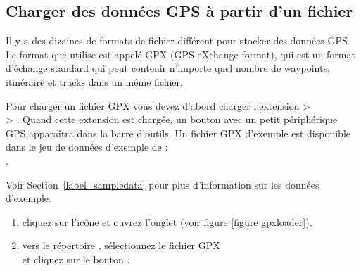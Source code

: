 \subsection{Charger des données GPS à partir d'un fichier}\label{label_loadgps}

Il y a des dizaines de formats de fichier différent pour stocker des données
GPS.
Le format que \qg utilise est appelé GPX (GPS eXchange format), qui est un format d'échange standard qui peut contenir n'importe quel nombre de waypoints, itinéraire et tracks dans un même fichier.

Pour charger un fichier GPX vous devez d'abord charger l'extension  >\\  > . Quand cette extension est chargée, un bouton avec un petit périphérique GPS apparaîtra dans la barre d'outils. Un fichier GPX d'exemple est disponible dans le jeu de données d'exemple de \qg :\\
. 
\par
Voir Section~\ref{label_sampledata} pour plus d'information sur les données d'exemple.

\begin{enumerate}
\item cliquez sur l'icône  et ouvrez l'onglet  (voir figure \ref{figure gpxloader}).
\item {} vers le répertoire , sélectionnez le fichier GPX\\  et cliquez sur le bouton .
\end{enumerate}

